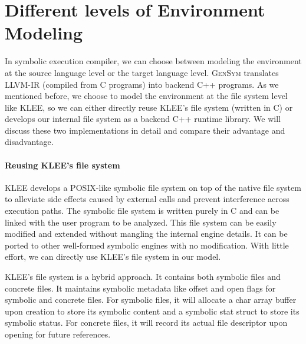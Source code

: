 \documentclass[sigplan, nonacm]{acmart}\settopmatter{printfolios=true,printccs=false,printacmref=false}
\newcommand{\tool}{\textsc{GenSym}\xspace}
\begin{document}
\section{Different levels of Environment Modeling}\label{twofsimpl}
In symbolic execution compiler, we can choose between modeling the environment at the source language level or the target language level. \tool translates LLVM-IR (compiled from C programs) into backend C++ programs. As we mentioned before, we choose to model the environment at the file system level like KLEE, so we can either directly reuse KLEE's file system (written in C) or develops our internal file system as a backend C++ runtime library. We will discuss these two implementations in detail and compare their advantage and disadvantage.
\paragraph*{Reusing KLEE's file system}
KLEE develops a POSIX-like symbolic file system on top of the native file system to alleviate side effects caused by external calls and prevent interference across execution paths. The symbolic file system is written purely in C and can be linked with the user program to be analyzed. This file system can be easily modified and extended without mangling
 the internal engine details. It can be ported to other well-formed symbolic engines with no modification. With little effort, we can directly use KLEE's file system in our model.\par
 KLEE's file system is a hybrid approach. It contains both symbolic files and concrete files. It maintains symbolic metadata like offset and open flags for symbolic and concrete files. For symbolic files, it will allocate a char array buffer upon creation to store its symbolic content and a symbolic stat struct to store its symbolic status. For concrete files, it will record its actual file descriptor upon opening for future references.\par
\end{document}
